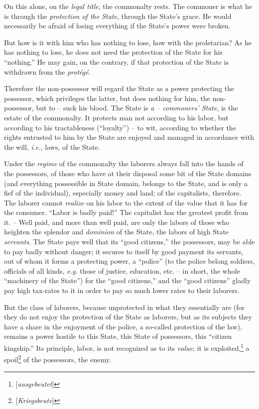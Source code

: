 \documentclass[12pt,a4paper]{book}
\begin{document}
On this alone, on the \textit{legal title}, the commonalty rests. The commoner 
is what he is through the \textit{protection of the State}, through the 
State's grace. He would necessarily be afraid of losing everything if the 
State's power were broken.

But how is it with him who has nothing to lose, how with the proletarian? As 
he has nothing to lose, he does not need the protection of the State for his 
``nothing.'' He may gain, on the contrary, if that protection of the State 
is withdrawn from the \textit{prot\'eg\'e}.

Therefore the non-possessor will regard the State as a power protecting the 
possessor, which privileges the latter, but does nothing for him, the 
non-possessor, but to -- suck his blood. The State is \textit{a -- commoners' 
State}, is the estate of the commonalty. It protects man not according to his 
labor, but according to his tractableness (``loyalty'') -- to wit, according 
to whether the rights entrusted to him by the State are enjoyed and managed in 
accordance with the will, \textit{i.e.}, laws, of the State.

Under the \textit{regime} of the commonalty the laborers always fall into the 
hands of the possessors, of those who have at their disposal some bit of the 
State domains (and everything possessible in State domain, belongs to the 
State, and is only a fief of the individual), especially money and land; of 
the capitalists, therefore. The laborer cannot \textit{realize} on his labor 
to the extent of the value that it has for the consumer. ``Labor is badly 
paid!'' The capitalist has the greatest profit from it. -- Well paid, and 
more than well paid, are only the labors of those who heighten the splendor 
and \textit{dominion} of the State, the labors of high State 
\textit{servants}. The State pays well that its ``good citizens,'' the 
possessors, may be able to pay badly without danger; it secures to itself by 
good payment its servants, out of whom it forms a protecting power, a 
``police'' (to the police belong soldiers, officials of all kinds, 
\textit{e.g.} those of justice, education, etc. -- in short, the whole 
``machinery of the State'') for the ``good citizens,'' and the ``good 
citizens'' gladly pay high tax-rates to it in order to pay so much lower 
rates to their laborers.

But the class of laborers, because unprotected in what they essentially are 
(for they do not enjoy the protection of the State as laborers, but as its 
subjects they have a share in the enjoyment of the police, a so-called 
protection of the law), remains a power hostile to this State, this State of 
possessors, this ``citizen kingship.'' Its principle, labor, is not 
recognized as to its \textit{value}; it is 
exploited,\footnote{[\textit{ausgebeutet}]} a 
spoil\footnote{[\textit{Kriegsbeute}]} of the possessors, the enemy.
\end{document}
